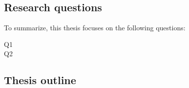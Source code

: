 
\lipsum[1] 

\lipsum[2] 

\lipsum[14]

\subsection{Research questions}

To summarize, this thesis focuses on the following questions:


\begin{description}
    \item[Q1] \lipsum[1][1-2]
    \item[Q2] \lipsum[1][3-4]
\end{description}

\subsection{Thesis outline}

\lipsum[3][5-10]